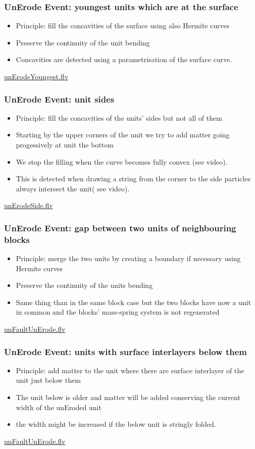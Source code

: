 \documentclass{beamer}
\begin{document}
	\begin{frame}
	\frametitle{UnErode Event:  youngest units which are at the surface}
	\begin{itemize}
	\item Principle: fill the concavities of the surface using also Hermite curves
	\item Preserve the continuity of the unit bending 
	\item Concavities are detected using a parametrisation of the surface curve.
	\end{itemize}
	\url{unErodeYoungest.flv}
	\end{frame}	
	
	\begin{frame}
	\frametitle{UnErode Event: unit sides}
	\begin{itemize}
	\item Principle: fill the concavities of the units' sides but not all of them
	\item Starting by the upper corners of the unit we try to add matter going progessively at unit the bottom 
	\item We stop the filling when the curve becomes fully convex (see video).
	\item This is detected when drawing a string from the corner to the side particles always intersect the unit( see video).
	\end{itemize}
	\url{unErodeSide.flv}
	\end{frame}
	
	
	\begin{frame}
	\frametitle{UnErode Event: gap between two units of neighbouring blocks}
	\begin{itemize}
	\item Principle: merge the two units by creating a boundary if necessary using Hermite curves
	\item Preserve the continuity of the units bending
	\item Same thing than in the same block case but the two blocks have now a unit in common and the blocks' mass-spring system is not regenerated
	\end{itemize}
	\url{unFaultUnErode.flv}
	\end{frame}	

	\begin{frame}
	\frametitle{UnErode Event: units with surface interlayers below them}
	\begin{itemize}
	\item Principle: add matter to the unit where there are surface interlayer of the unit just below them
	\item The unit below is older and matter will be added conserving the current width of the unEroded unit
	\item the width might be increased if the below unit is stringly folded.
	\end{itemize}
	\url{unFaultUnErode.flv}
	\end{frame}		
	
\end{document}

